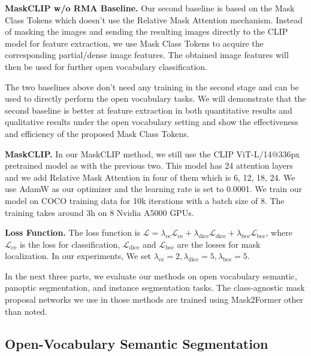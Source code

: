 \documentclass{article}
\theoremstyle{plain}
\theoremstyle{definition}
\theoremstyle{remark}
\begin{document}
\textbf{MaskCLIP w/o RMA Baseline.} Our second baseline is based on the Mask Class Tokens which doesn't use the Relative Mask Attention mechanism. Instead of masking the images and sending the resulting images directly to the CLIP model for feature extraction, we use Mask Class Tokens to acquire the corresponding partial/dense image features. The obtained image features will then be used for further open vocabulary classification.

The two baselines above don't need any training in the second stage and can be used to directly perform the open vocabulary tasks. We will demonstrate that the second baseline is better at feature extraction in both quantitative results and qualitative results under the open vocabulary setting and show the effectiveness and efficiency of the proposed Mask Class Tokens.

\textbf{MaskCLIP.} In our MaskCLIP method, we still use the CLIP ViT-L/14@336px pretrained model as with the previous two. This model has 24 attention layers and we add Relative Mask Attention in four of them which is 6, 12, 18, 24. We use AdamW \citep{loshchilov2017decoupled} as our optimizer and the learning rate is set to 0.0001. We train our model on COCO training data for 10k iterations with a batch size of 8. The training takes around 3h on 8 Nvidia A5000 GPUs.

{
\textbf{Loss Function.} The loss function is $\mathcal{L} = \lambda_{\text{ce}} \mathcal{L}_{\text{ce}} + \lambda_{\text{dice}} \mathcal{L}_{\text{dice}} + \lambda_{\text{bce}} \mathcal{L}_{\text{bce}}$, where $ \mathcal{L}_{\text{ce}}$ is the loss for classification, $\mathcal{L}_{\text{dice}}$ and  $\mathcal{L}_{\text{bce}}$ are the losses for mask localization. In our experiments, We set $\lambda_{\text{ce}}=2, \lambda_\text{dice}=5, \lambda_\text{bce}=5$. 
}

In the next three parts, we evaluate our methods on open vocabulary semantic, panoptic segmentation, and instance segmentation tasks. The class-agnostic mask proposal networks we use in those methods are trained using Mask2Former other than noted.

\subsection{Open-Vocabulary Semantic Segmentation}
\end{document}
